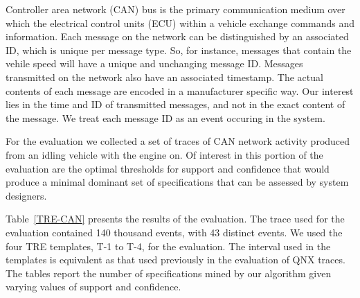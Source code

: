 \documentclass[]{sigplanconf}
\begin{document}
\begin{table}[ht]
  \caption{Mining TREs on CAN Traces} \label{TRE-CAN}
\end{table}

Controller area network (CAN) bus is the primary communication medium over which the electrical control units (ECU) within a vehicle exchange commands and information. Each message on the network can be distinguished by an associated ID, which is unique per message type. So, for instance, messages that contain the vehile speed will have a unique and unchanging message ID. Messages transmitted on the network also have an associated timestamp. The actual contents of each message are encoded in a manufacturer specific way. Our interest lies in the time and ID of transmitted messages, and not in the exact content of the message. We treat each message ID as an event occuring in the system.

For the evaluation we collected a set of traces of CAN network activity produced from an idling vehicle with the engine on. Of interest in this portion of the evaluation are the optimal thresholds for support and confidence that would produce a minimal dominant set of specifications that can be assessed by system designers.

Table~\ref{TRE-CAN} presents the results of the evaluation. The trace used for the evaluation contained 140 thousand events, with 43 distinct events. We used the four TRE templates, T-1 to T-4, for the evaluation. The interval used in the templates is equivalent as that used previously in the evaluation of QNX traces. The tables report the number of specifications mined by our algorithm given varying values of support and confidence.
\end{document}
